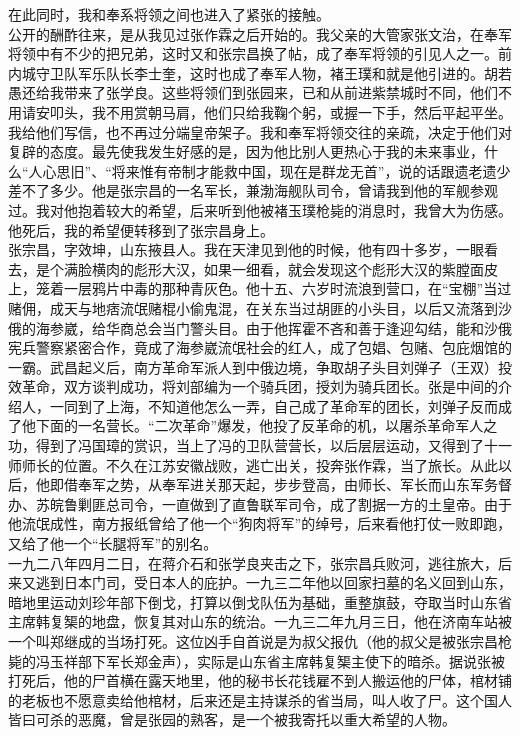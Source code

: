 在此同时，我和奉系将领之间也进入了紧张的接触。\\

公开的酬酢往来，是从我见过张作霖之后开始的。我父亲的大管家张文治，在奉军将领中有不少的把兄弟，这时又和张宗昌换了帖，成了奉军将领的引见人之一。前内城守卫队军乐队长李士奎，这时也成了奉军人物，褚王璞和就是他引进的。胡若愚还给我带来了张学良。这些将领们到张园来，已和从前进紫禁城时不同，他们不用请安叩头，我不用赏朝马肩，他们只给我鞠个躬，或握一下手，然后平起平坐。我给他们写信，也不再过分端皇帝架子。我和奉军将领交往的亲疏，决定于他们对复辟的态度。最先使我发生好感的是，因为他比别人更热心于我的未来事业，什么“人心思旧”、“将来惟有帝制才能救中国，现在是群龙无首”，说的话跟遗老遗少差不了多少。他是张宗昌的一名军长，兼渤海舰队司令，曾请我到他的军舰参观过。我对他抱着较大的希望，后来听到他被褚玉璞枪毙的消息时，我曾大为伤感。他死后，我的希望便转移到了张宗昌身上。\\

张宗昌，字效坤，山东掖县人。我在天津见到他的时候，他有四十多岁，一眼看去，是个满脸横肉的彪形大汉，如果一细看，就会发现这个彪形大汉的紫膛面皮上，笼着一层鸦片中毒的那种青灰色。他十五、六岁时流浪到营口，在“宝棚”当过赌佣，成天与地痞流氓赌棍小偷鬼混，在关东当过胡匪的小头目，以后又流落到沙俄的海参崴，给华商总会当门警头目。由于他挥霍不吝和善于逢迎勾结，能和沙俄宪兵警察紧密合作，竟成了海参崴流氓社会的红人，成了包娼、包赌、包庇烟馆的一霸。武昌起义后，南方革命军派人到中俄边境，争取胡子头目刘弹子（王双）投效革命，双方谈判成功，将刘部编为一个骑兵团，授刘为骑兵团长。张是中间的介绍人，一同到了上海，不知道他怎么一弄，自己成了革命军的团长，刘弹子反而成了他下面的一名营长。“二次革命”爆发，他投了反革命的机，以屠杀革命军人之功，得到了冯国璋的赏识，当上了冯的卫队营营长，以后层层运动，又得到了十一师师长的位置。不久在江苏安徽战败，逃亡出关，投奔张作霖，当了旅长。从此以后，他即借奉军之势，从奉军进关那天起，步步登高，由师长、军长而山东军务督办、苏皖鲁剿匪总司令，一直做到了直鲁联军司令，成了割据一方的土皇帝。由于他流氓成性，南方报纸曾给了他一个“狗肉将军”的绰号，后来看他打仗一败即跑，又给了他一个“长腿将军”的别名。\\

一九二八年四月二日，在蒋介石和张学良夹击之下，张宗昌兵败河，逃往旅大，后来又逃到日本门司，受日本人的庇护。一九三二年他以回家扫墓的名义回到山东，暗地里运动刘珍年部下倒戈，打算以倒戈队伍为基础，重整旗鼓，夺取当时山东省主席韩复榘的地盘，恢复其对山东的统治。一九三二年九月三日，他在济南车站被一个叫郑继成的当场打死。这位凶手自首说是为叔父报仇（他的叔父是被张宗昌枪毙的冯玉祥部下军长郑金声），实际是山东省主席韩复榘主使下的暗杀。据说张被打死后，他的尸首横在露天地里，他的秘书长花钱雇不到人搬运他的尸体，棺材铺的老板也不愿意卖给他棺材，后来还是主持谋杀的省当局，叫人收了尸。这个国人皆曰可杀的恶魔，曾是张园的熟客，是一个被我寄托以重大希望的人物。\\

